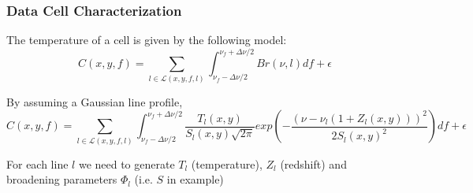 \documentclass[slidestop,compress,mathserif,color,12pt]{beamer}
\begin{document}


\begin{frame}
  \frametitle{Data Cell Characterization}
\scriptsize
{}

The temperature of a cell is given by the following model:
\begin{equation}
C(x,y,f)=\sum_{l \in \mathcal{L}(x,y,f,l)}
\int_{\nu_f - \Delta
\nu/2}^{\nu_f + \Delta \nu/2} 
Br(\nu,l)df + \epsilon
\label{eq:base}
\end{equation}

\begin{example}
By assuming a Gaussian line profile,
\begin{equation}
C(x,y,f)=\sum_{l \in \mathcal{L}(x,y,f,l)}
\int_{\nu_f - \Delta
\nu/2}^{\nu_f + \Delta \nu/2} 
\frac{T_l(x,y)}{S_l(x,y) \sqrt{2\pi}}exp\left(- \frac{(\nu - \nu_l(1 +
Z_l(x,y)))^2}{2S_l(x,y)^2}\right) df +
\epsilon
\label{eq:base}
\end{equation}
\end{example}

For each line $l$ we need to generate $T_l$ (temperature),
$Z_l$ (redshift) and broadening parameters $\Phi_l$ 
(i.e. $S$ in example)
\end{frame}
\end{document}

